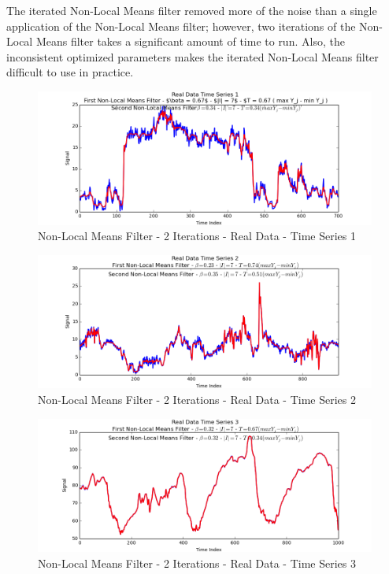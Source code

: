 \documentclass[11pt]{article}
\theoremstyle{definition}
\begin{document}
The iterated Non-Local Means filter removed more of the noise than a single application of the Non-Local Means filter; however, two iterations of the Non-Local Means filter takes a significant amount of time to run. Also, the inconsistent optimized  parameters makes the iterated Non-Local Means filter difficult to use in practice.

\begin{figure}
\centering
\includegraphics[width = 0.75 \textwidth]{MultiNLMeansRealSignal1.png}
\caption{Non-Local Means Filter - 2 Iterations - Real Data - Time Series 1}
\label{multinlmeansrealsignal1}
\end{figure}

\begin{figure}
\centering
\includegraphics[width = 0.75 \textwidth]{MultiNLMeansRealSignal2.png}
\caption{Non-Local Means Filter - 2 Iterations - Real Data - Time Series 2}
\label{multinlmeansrealsignal2}
\end{figure}

\begin{figure}
\centering
\includegraphics[width = 0.75 \textwidth]{MultiNLMeansRealSignal3.png}
\caption{Non-Local Means Filter - 2 Iterations - Real Data - Time Series 3}
\label{multinlmeansrealsignal3}
\end{figure}
\end{document}
